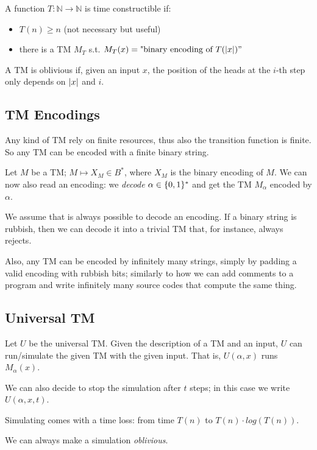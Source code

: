 \begin{definition} \label{def:time_constructible}
    A function $T : \mathbb{N} \rightarrow \mathbb{N}$ is time constructible if:
    \begin{itemize}
        \item $T(n) \geq n$ (not necessary but useful)
        \item there is a TM $M_T$ s.t. $M_T (x) = \text{"binary encoding of } T(\vert x \vert)"$
    \end{itemize}
\end{definition}

\begin{definition}[Oblivious TM] \label{def:oblivious_tm}
    A TM is oblivious if, given an input $x$, the position of the heads at the $i$-th step only depends on $\vert x \vert$ and $i$.
\end{definition}


\subsection{TM Encodings} \label{subsec:tm_encodings}
    Any kind of TM rely on finite resources, thus also the transition function is finite.
    So any TM can be encoded with a finite binary string.

    Let $M$ be a TM; $M \mapsto X_M \in B^*$, where $X_M$ is the binary encoding of $M$.
    We can now also read an encoding: we \textit{decode} $\alpha \in \{ 0,1 \}^*$ and get the TM $M_\alpha$ encoded by $\alpha$.
    
    We assume that is always possible to decode an encoding.
    If a binary string is rubbish, then we can decode it into a trivial TM that, for instance, always rejects.

    Also, any TM can be encoded by infinitely many strings, simply by padding a valid encoding with rubbish bits; similarly to how we can add comments to a program and write infinitely many source codes that compute the same thing.


\subsection{Universal TM} \label{subsec:universal_tm}
    Let $U$ be the universal TM.
    Given the description of a TM and an input, $U$ can run/simulate the given TM with the given input.
    That is, $U(\alpha, x)$ runs $M_\alpha (x)$.

    We can also decide to stop the simulation after $t$ steps; in this case we write $U(\alpha, x, t)$.

    Simulating comes with a time loss: from time $T(n)$ to $T(n) \cdot log(T(n))$.

    We can always make a simulation \textit{oblivious}.